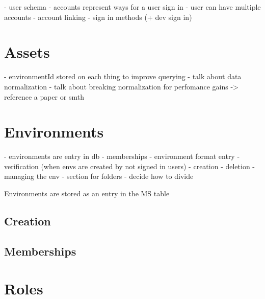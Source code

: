 

- user schema
- accounts represent ways for a user sign in
- user can have multiple accounts
- account linking
- sign in methods (+ dev sign in)





\section{Assets}

- environmentId stored on each thing to improve querying
- talk about data normalization
- talk about breaking normalization for perfomance gains -> reference a paper or smth

\section{Environments}

- environments are entry in db
- memberships
- environment format entry
- verification (when envs are created by not signed in users)
- creation
- deletion - managing the env
- section for folders
- decide how to divide 

Environments are stored as an entry in the MS table


\subsection{Creation}
\subsection{Memberships}

\section{Roles}



